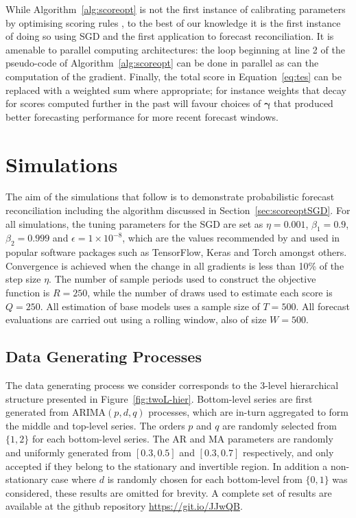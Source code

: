 \documentclass[11pt]{article}
\theoremstyle{definition}
\begin{document}
While Algorithm~\ref{alg:scoreopt} is not the first instance of calibrating parameters by optimising scoring rules \citep[see][for an earlier example]{gneiting2005}, to the best of our knowledge it is the first instance of doing so using SGD and the first application to forecast reconciliation. It is amenable to parallel computing architectures: the loop beginning at line 2 of the pseudo-code of Algorithm~\ref{alg:scoreopt} can be done in parallel as can the computation of the gradient. Finally, the total score in Equation~\eqref{eq:tes} can be replaced with a weighted sum where appropriate; for instance weights that decay for scores computed further in the past will favour choices of $\bm{\gamma}$ that produced better forecasting performance for more recent forecast windows.

\section{Simulations}\label{sec:simulations}

The aim of the simulations that follow is to demonstrate probabilistic forecast reconciliation including the algorithm discussed in Section~\ref{sec:scoreoptSGD}. For all simulations, the tuning parameters for the SGD are set as $\eta=0.001$, $\beta_1=0.9$, $\beta_2=0.999$ and $\epsilon=1\times 10^{-8}$, which are the values recommended by \cite{kingma2014} and used in popular software packages such as TensorFlow, Keras and Torch amongst others. Convergence is achieved when the change in all gradients is less than 10\% of the step size $\eta$. The number of sample periods used to construct the objective function is $R=250$, while the number of draws used to estimate each score is $Q=250$. All estimation of base models uses a sample size of $T=500$. All forecast evaluations are carried out using a rolling window, also of size $W=500$.

\subsection{Data Generating Processes}\label{sec:dgp}

The data generating process we consider corresponds to the 3-level hierarchical structure presented in Figure~\ref{fig:twoL-hier}. Bottom-level series are first generated from ARIMA$(p,d,q)$ processes, which are in-turn aggregated to form the middle and top-level series. The orders $p$ and $q$ are randomly selected from $\{1,2\}$ for each bottom-level series. The AR and MA parameters are randomly and uniformly generated from $[0.3,0.5]$ and $[0.3,0.7]$ respectively, and only accepted if they belong to the stationary and invertible region. In addition a non-stationary case where $d$ is randomly chosen for each bottom-level from $\{0,1\}$ was considered, these results are omitted for brevity. A complete set of results are available at the github repository \url{https://git.io/JJwQB}.
\end{document}
